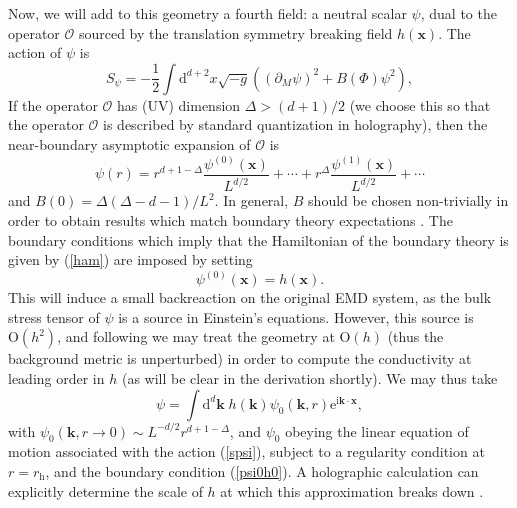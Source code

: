 \documentclass[10pt, oneside]{book}
\begin{document}
\begin{doublespace}
Now, we will add to this geometry a fourth field:  a neutral scalar $\psi$, dual to the operator $\mathcal{O}$ sourced by the translation symmetry breaking field $h(\mathbf{x})$.   The action of $\psi$ is \begin{equation}
S_\psi = -\frac{1}{2} \int \mathrm{d}^{d+2}x\sqrt{-g} \left( (\partial_M\psi)^2 + B(\Phi)\psi^2\right),  \label{spsi}
\end{equation}
If the operator $\mathcal{O}$ has (UV) dimension $\Delta > (d+1)/2$ (we choose this so that the operator $\mathcal{O}$ is described by standard quantization in holography), then the near-boundary asymptotic expansion of $\mathcal{O}$ is \begin{equation}
\psi(r) = r^{d+1-\Delta} \frac{\psi^{(0)}(\mathbf{x})}{L^{d/2}}  + \cdots + r^\Delta \frac{\psi^{(1)}(\mathbf{x})}{L^{d/2}} + \cdots
\end{equation}and $B(0)= \Delta(\Delta-d-1)/L^2$.      In general, $B$ should be chosen non-trivially in order to obtain results which match boundary theory expectations \cite{lucas1401}.
The boundary conditions which imply that the Hamiltonian of the boundary theory is given by (\ref{ham}) are imposed by setting \begin{equation}
\psi^{(0)}(\mathbf{x}) = h(\mathbf{x}).   \label{psi0h0}
\end{equation}
This will induce a small backreaction on the original EMD system, as the bulk stress tensor of $\psi$ is a source in Einstein's equations.   However, this source is $\mathrm{O}(h^2)$, and following \cite{Blake:2013owa, lucas1401} we may treat the geometry at $\mathrm{O}(h)$ (thus the background metric is unperturbed) in order to compute the conductivity at leading order in $h$ (as will be clear in the derivation shortly).    We may thus take \begin{equation}
\psi = \int \mathrm{d}^d\mathbf{k} \; h(\mathbf{k}) \psi_0(\mathbf{k},r) \mathrm{e}^{\mathrm{i}\mathbf{k}\cdot\mathbf{x}},
\end{equation}with $\psi_0(\mathbf{k},r\rightarrow 0)\sim L^{-d/2}r^{d+1-\Delta}$, and $\psi_0$ obeying the linear equation of motion associated with the action (\ref{spsi}), subject to a regularity condition at $r=r_{\mathrm{h}}$, and the boundary condition (\ref{psi0h0}).  A holographic calculation can explicitly determine the scale of $h$ at which this approximation breaks down \cite{lucas1401}.     


\end{doublespace}
\end{document}
